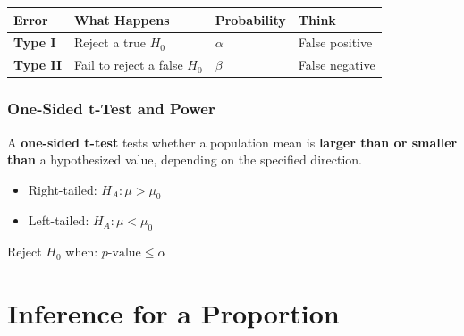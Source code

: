 \documentclass[
  letterpaper,
  DIV=11,
  numbers=noendperiod]{scrreprt}
\newcounter{none} %
\providecommand{\tightlist}{%
  \setlength{\itemsep}{0pt}\setlength{\parskip}{0pt}}
\begin{document}
{\def\LTcaptype{none} %
\begin{longtable}[]{@{}
  >{\raggedright\arraybackslash}p{}
  >{\raggedright\arraybackslash}p{}
  >{\raggedright\arraybackslash}p{}
  >{\raggedright\arraybackslash}p{}@{}}
\toprule\noalign{}
\begin{minipage}[b]{\linewidth}\raggedright
Error
\end{minipage} & \begin{minipage}[b]{\linewidth}\raggedright
What Happens
\end{minipage} & \begin{minipage}[b]{\linewidth}\raggedright
Probability
\end{minipage} & \begin{minipage}[b]{\linewidth}\raggedright
Think
\end{minipage} \\
\midrule\noalign{}
\endhead
\bottomrule\noalign{}
\endlastfoot
\textbf{Type I} & Reject a true \(H_0\) & \(\alpha\) & False positive \\
\textbf{Type II} & Fail to reject a false \(H_0\) & \(\beta\) & False
negative \\
\end{longtable}
}

\subsubsection{One-Sided t-Test and
Power}\label{one-sided-t-test-and-power}

A \textbf{one-sided t-test} tests whether a population mean is
\textbf{larger than or smaller than} a hypothesized value, depending on
the specified direction.

\begin{itemize}
\tightlist
\item
  Right-tailed: \(H_A: \mu > \mu_0\)
\item
  Left-tailed: \(H_A: \mu < \mu_0\)
\end{itemize}

Reject \(H_0\) when: \(p\text{-value} \leq \alpha\)

\section{Inference for a Proportion}\label{inference-for-a-proportion}
\end{document}
